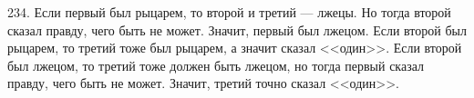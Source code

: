234. Если первый был рыцарем, то второй и третий --- лжецы. Но тогда второй сказал правду, чего быть не может. Значит, первый был лжецом. Если второй был рыцарем, то третий тоже был рыцарем, а значит сказал <<один>>. Если второй был лжецом, то третий тоже должен быть лжецом, но тогда первый сказал правду, чего быть не может. Значит, третий точно сказал <<один>>.\\
